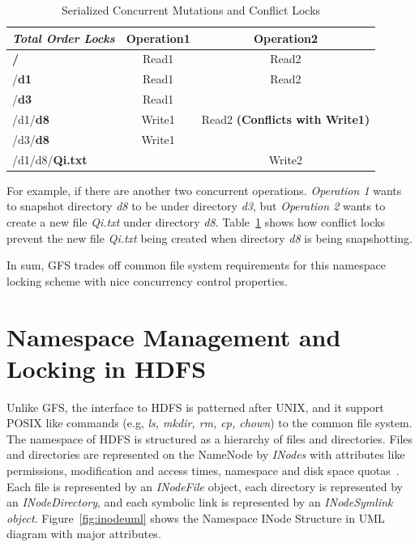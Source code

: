 \begin{table}[ht]
	\centering
	\begin{tabular}{|l|c|c|}
		\hline
		\textbf{\textit{Total Order Locks}}             & \textbf{Operation1} & \textbf{Operation2}                    \\ \hline
		\textbf{\color{red}/}             & Read1      & Read2                         \\ \hline
		/\textbf{\color{red}d1}           & Read1      & Read2                         \\ \hline
		/\textbf{\color{red}d3}           & Read1      & ~                             \\ \hline
		/d1/\textbf{\color{red}d8}        & Write1     & Read2 \textbf{(Conflicts with Write1)} \\ \hline
		/d3/\textbf{\color{red}d8}       & Write1     & ~                             \\ \hline
		/d1/d8/\textbf{\color{red}Qi.txt} & ~          & Write2                        \\ \hline
	\end{tabular}
	\caption{Serialized Concurrent Mutations and Conflict Locks}
	\label{table:gfsLock2}
\end{table}

\noindent For example, if there are another two concurrent operations. \textit{Operation 1} wants to snapshot directory \textit{d8} to be under directory \textit{d3}, but \textit{Operation 2} wants to create a new file \textit{Qi.txt} under directory \textit{d8}. Table~\ref{table:gfsLock2} shows how conflict locks prevent the new file \textit{Qi.txt} being created when directory \textit{d8} is being snapshotting.

\noindent In sum, GFS trades off common file system requirements for this namespace locking scheme with nice concurrency control properties.

\section{Namespace Management and Locking in HDFS}

Unlike GFS, the interface to HDFS is patterned after UNIX, and it support POSIX like commands (e.g, \textit{ls, mkdir, rm, cp, chown}) to the common file system. The namespace of HDFS is structured as a hierarchy of files and directories. Files and directories are represented on the NameNode by \textit{INodes} with attributes like permissions, modification and access times, namespace and disk space quotas~\cite{borthakur2008hdfs}. Each file is represented by an \textit{INodeFile} object, each directory is represented by an \textit{INodeDirectory}, and each symbolic link is represented by an \textit{INodeSymlink object}. Figure~\ref{fig:inodeuml} shows the Namespace INode Structure in UML diagram with major attributes.

